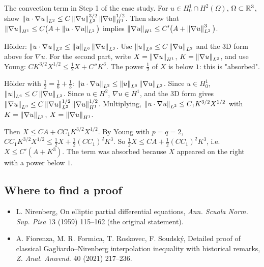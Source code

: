 \begin{exercise}
  The convection term in Step 1 of the case study. For $u \in H^1_0 \cap H^2(\Omega)$, $\Omega \subset \mathbb{R}^3$, show $\left\lVert u\cdot\nabla u\right\rVert_{L^2} \le C\left\lVert \nabla u\right\rVert_{L^2}^{3/2}\left\lVert \nabla u\right\rVert_{H^1}^{1/2}$. Then show that $\left\lVert \nabla u\right\rVert_{H^1} \le C\big(A + \left\lVert u\cdot\nabla u\right\rVert_{L^2}\big)$ implies $\left\lVert \nabla u\right\rVert_{H^1} \le C'\big(A + \left\lVert \nabla u\right\rVert_{L^2}^3\big)$.
  \begin{hint}
    Hölder: $\left\lVert u\cdot\nabla u\right\rVert_{L^2} \le \left\lVert u\right\rVert_{L^6}\left\lVert \nabla u\right\rVert_{L^3}$. Use $\left\lVert u\right\rVert_{L^6} \le C\left\lVert \nabla u\right\rVert_{L^2}$ and the 3D form above for $\nabla u$. For the second part, write $X = \left\lVert \nabla u\right\rVert_{H^1}$, $K = \left\lVert \nabla u\right\rVert_{L^2}$, and use Young: $CK^{3/2}X^{1/2} \le \frac12 X + C''K^3$. The power $\frac12$ of $X$ is below $1$: this is "absorbed".
  \end{hint}
  \begin{solution}
    Hölder with $\frac12 = \frac16 + \frac13$: $\left\lVert u\cdot\nabla u\right\rVert_{L^2} \le \left\lVert u\right\rVert_{L^6}\left\lVert \nabla u\right\rVert_{L^3}$. Since $u \in H^1_0$, $\left\lVert u\right\rVert_{L^6} \le C\left\lVert \nabla u\right\rVert_{L^2}$. Since $u \in H^2$, $\nabla u \in H^1$, and the 3D form gives $\left\lVert \nabla u\right\rVert_{L^3} \le C\left\lVert \nabla u\right\rVert_{L^2}^{1/2}\left\lVert \nabla u\right\rVert_{H^1}^{1/2}$. Multiplying, $\left\lVert u\cdot\nabla u\right\rVert_{L^2} \le C_1K^{3/2}X^{1/2}$ with $K = \left\lVert \nabla u\right\rVert_{L^2}$, $X = \left\lVert \nabla u\right\rVert_{H^1}$.

    Then $X \le CA + CC_1K^{3/2}X^{1/2}$. By Young with $p = q = 2$, $CC_1K^{3/2}X^{1/2} \le \frac12X + \frac12(CC_1)^2K^3$. So $\frac12X \le CA + \frac12(CC_1)^2K^3$, i.e. $X \le C'(A + K^3)$. The term was absorbed because $X$ appeared on the right with a power below $1$.
  \end{solution}
\end{exercise}

\subsection*{Where to find a proof}

\begin{itemize}
\item L. Nirenberg, On elliptic partial differential equations, \emph{Ann. Scuola Norm. Sup. Pisa} 13 (1959) 115--162 (the original statement).
\item A. Fiorenza, M. R. Formica, T. Roskovec, F. Soudský, Detailed proof of classical Gagliardo--Nirenberg interpolation inequality with historical remarks, \emph{Z. Anal. Anwend.} 40 (2021) 217--236.
\end{itemize}

\neededfor
